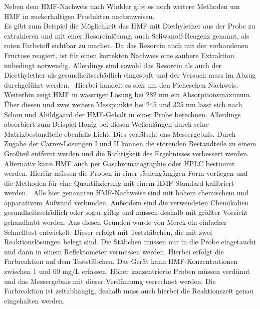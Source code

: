 Neben dem HMF-Nachweis nach Winkler gibt es noch weitere Methoden um HMF in zuckerhaltigen Produkten nachzuweisen.\\
Es gibt zum Beispiel die Möglichkeit das HMF mit Diethylether aus der Probe zu extrahieren und mit einer Resorcinlösung, auch Seliwanoff-Reagenz genannt, als roten Farbstoff sichtbar zu machen. Da das Resorcin auch mit der vorhandenen Fructose reagiert, ist für einen korrekten Nachweis eine saubere Extraktion unbedingt notwendig. Allerdings sind sowohl das Resorcin als auch der Dieethylether als gesundheitsschädlich eingestuft und der Versuch muss im Abzug durchgeführt werden.~\cite{Resorcinnachweis}
Hierbei handelt es sich um den Fieheschen Nachweis.~\cite{Winkler}\\
Weiterhin zeigt HMF in wässriger Lösung bei 282 nm ein Absorptionsmaximum. Über diesen und zwei weitere Messpunkte bei 245 und 325 nm lässt sich nach Schou und Abildgaard der HMF-Gehalt in einer Probe berechnen. Allerdings absorbiert zum Beispiel Honig bei diesen Wellenlängen durch seine Matrixbestandteile ebenfalls Licht. Dies verfälscht das Messergebnis. Durch Zugabe der Carrez-Lösungen I und II können die störenden Bestandteile zu einem Großteil entfernt werden und die Richtigkeit des Ergebnisses verbessert werden.~\cite{Winkler}
Alternativ kann HMF auch per Gaschromatographie oder HPLC bestimmt werden. Hierfür müssen die Proben in einer säulengängigen Form vorliegen und die Methoden für eine Quantifizierung mit einem HMF-Standard kalibriert werden.~\cite{Patent}
Alle hier genannten HMF-Nachweise sind mit hohem chemischem und apparativem Aufwand verbunden. Außerdem sind die verwendeten Chemikalien gesundheitsschädlich oder sogar giftig und müssen deshalb mit größter Vorsicht gehandhabt werden. Aus diesen Gründen wurde von Merck ein einfacher Schnelltest entwickelt. Dieser erfolgt mit Teststäbchen, die mit zwei Reaktionslösungen belegt sind. Die Stäbchen müssen nur in die Probe eingetaucht und dann in einem Reflektometer vermessen werden. Hierbei erfolgt die Farbreaktion auf dem Teststäbchen. Das Gerät kann HMF-Konzentrationen zwischen 1 und 60 mg/L erfassen. Höher konzentrierte Proben müssen verdünnt und das Messergebnis mit dieser Verdünnung verrechnet werden. Die Farbreaktion ist zeitabhängig, deshalb muss auch hierbei die Reaktionszeit genau eingehalten werden.~\cite{Merck}

